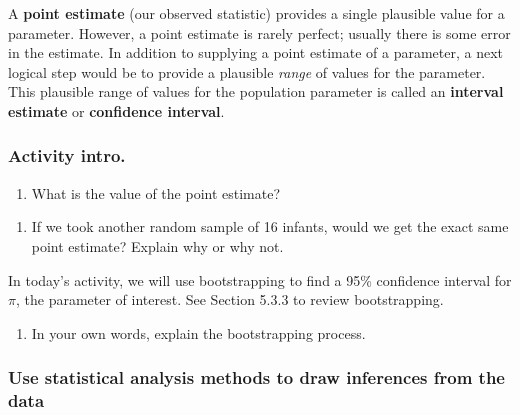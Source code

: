 \documentclass[
]{report}
\providecommand{\tightlist}{%
  \setlength{\itemsep}{0pt}\setlength{\parskip}{0pt}}
\begin{document}
A \textbf{point estimate} (our observed statistic) provides a single plausible value for a parameter. However, a point estimate is rarely perfect; usually there is some error in the estimate. In addition to supplying a point estimate of a parameter, a next logical step would be to provide a plausible \emph{range} of values for the parameter. This plausible range of values for the population parameter is called an \textbf{interval estimate} or \textbf{confidence interval}.

\hypertarget{activity-intro.}{%
\subsubsection*{Activity intro.}\label{activity-intro.}}

\begin{enumerate}
\def\labelenumi{\arabic{enumi}.}
\tightlist
\item
  What is the value of the point estimate?
\end{enumerate}

\vspace{0.5in}

\begin{enumerate}
\def\labelenumi{\arabic{enumi}.}
\setcounter{enumi}{1}
\tightlist
\item
  If we took another random sample of 16 infants, would we get the exact same point estimate? Explain why or why not.
\end{enumerate}

\vspace{0.5in}

In today's activity, we will use bootstrapping to find a 95\% confidence interval for \(\pi\), the parameter of interest. See Section 5.3.3 to review bootstrapping.

\begin{enumerate}
\def\labelenumi{\arabic{enumi}.}
\setcounter{enumi}{2}
\tightlist
\item
  In your own words, explain the bootstrapping process.
  \vspace{0.5in}
\end{enumerate}

\hypertarget{use-statistical-analysis-methods-to-draw-inferences-from-the-data-1}{%
\subsubsection*{Use statistical analysis methods to draw inferences from the data}\label{use-statistical-analysis-methods-to-draw-inferences-from-the-data-1}}
\end{document}
